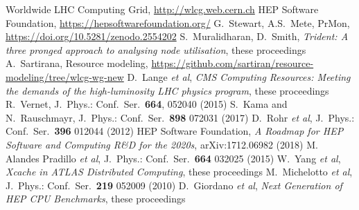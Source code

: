 \begin{thebibliography}{}
Worldwide LHC Computing Grid, \url{http://wlcg.web.cern.ch}
HEP Software Foundation, \url{https://hepsoftwarefoundation.org/}
G.~Stewart, A.S.~Mete, PrMon, \url{https://doi.org/10.5281/zenodo.2554202}
S.~Muralidharan, D.~Smith, \textit{Trident: A three pronged approach to analysing node utilisation}, these proceedings
A.~Sartirana, Resource modeling, \url{https://github.com/sartiran/resource-modeling/tree/wlcg-wg-new}
D.~Lange {\em et al}, \textit{CMS Computing Resources: Meeting the demands of the high-luminosity LHC physics program}, these proceedings
R.~Vernet, J.\ Phys.: Conf.\ Ser.\ \textbf{664}, 052040 (2015)
S.~Kama and N.~Rauschmayr, J.\ Phys.: Conf.\ Ser.\ {\bf 898} 072031 (2017)
D.~Rohr {\em et al}, J.\ Phys.: Conf.\ Ser.\ \textbf{396} 012044 (2012)
HEP Software Foundation, \textit{A Roadmap for HEP Software and Computing R\&D for the 2020s}, arXiv:1712.06982 (2018)
M. Alandes Pradillo {\em et al}, J.\ Phys.: Conf.\ Ser.\ \textbf{664} 032025 (2015)
W.~Yang {\em et al}, \textit{Xcache in ATLAS Distributed Computing}, these proceedings
M.~Michelotto {\em et al}, J.\ Phys.: Conf.\ Ser.\ \textbf{219} 052009 (2010)
D.~Giordano {\em et al}, \textit{Next Generation of HEP CPU Benchmarks}, these proceedings
\end{thebibliography}
